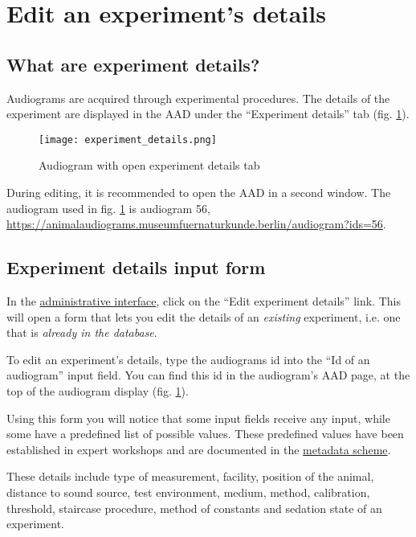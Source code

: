\documentclass{article}
\begin{document}
\section{Edit an experiment's details}
\subsection{What are experiment details?}
Audiograms are acquired through experimental procedures. The details of the experiment are displayed in the AAD under the ``Experiment details'' tab (fig. \ref{fig:experiment_details}).

\begin{figure}
\texttt{[image: experiment\_details.png]}
\caption{Audiogram with open experiment details tab}
\label{fig:experiment_details}
\end{figure}

\begin{it}During editing, it is recommended to open the AAD in a second window. The audiogram used in fig. \ref{fig:experiment_details} is audiogram 56, \url{https://animalaudiograms.museumfuernaturkunde.berlin/audiogram?ids=56}.
\end{it}
\subsection{Experiment details input form}
In the \href{https://animalaudiograms.museumfuernaturkunde.berlin/admin/v1/start}{administrative interface}, click on the ``Edit experiment details'' link. This will open a form that lets you edit the details of an \emph{existing} experiment, i.e. one that is \emph{already in the database}.

To edit an experiment's details, type the audiograms id into the ``Id of an audiogram'' input field. You can find this id in the audiogram's AAD page, at the top of the audiogram display (fig. \ref{fig:experiment_details}).

Using this form you will notice that some input fields receive any input, while some have a predefined list of possible values. These predefined values have been established in expert workshops and are documented in the \href{https://github.com/MfN-Berlin/AnimalAudiogramDatabase/blob/main/resources/metadata/audiogram_metadata_scheme.md}{metadata scheme}.

These details include type of measurement, facility, position of the animal, distance to sound source, test environment, medium, method, calibration, threshold, staircase procedure, method of constants and sedation state of an experiment. 
\end{document}
